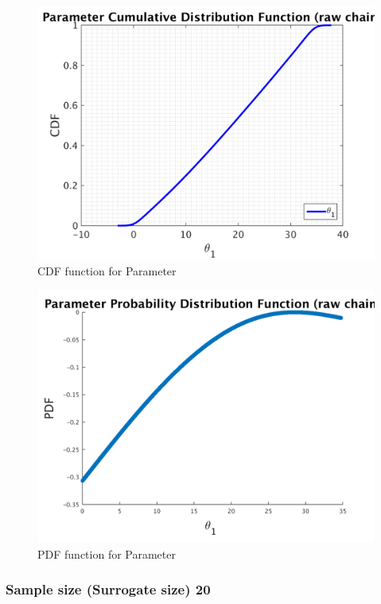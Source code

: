 \begin{figure}[h!]
  
  \centering
   \includegraphics[scale=0.75]{output_10/simple_ip_cdf_raw}
   \caption{CDF function for Parameter }
\end{figure}



\begin{figure}[h!]
  
  \centering
   \includegraphics[scale=0.75]{output_10/ip_logLike_unified}
   \caption{PDF function for Parameter }
\end{figure}



\subsubsection{Sample size (Surrogate size) 20 }

